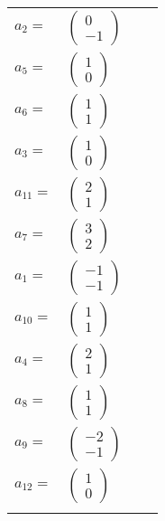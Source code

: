 \documentclass[1p]{elsarticle_modified}
\theoremstyle{definition}
\begin{document}
\begin{tabular}{m{7pt} m{180pt} m{7pt} m{180pt} }
\flushright $a_{2}=$&$\begin{pmatrix}0\\-1\end{pmatrix}$ \\
\flushright $a_{5}=$&$\begin{pmatrix}1\\0\end{pmatrix}$ \\
\flushright $a_{6}=$&$\begin{pmatrix}1\\1\end{pmatrix}$ \\
\flushright $a_{3}=$&$\begin{pmatrix}1\\0\end{pmatrix}$ \\
\flushright $a_{11}=$&$\begin{pmatrix}2\\1\end{pmatrix}$ \\
\flushright $a_{7}=$&$\begin{pmatrix}3\\2\end{pmatrix}$ \\
\flushright $a_{1}=$&$\begin{pmatrix}-1\\-1\end{pmatrix}$ \\
\flushright $a_{10}=$&$\begin{pmatrix}1\\1\end{pmatrix}$ \\
\flushright $a_{4}=$&$\begin{pmatrix}2\\1\end{pmatrix}$ \\
\flushright $a_{8}=$&$\begin{pmatrix}1\\1\end{pmatrix}$ \\
\flushright $a_{9}=$&$\begin{pmatrix}-2\\-1\end{pmatrix}$ \\
\flushright $a_{12}=$&$\begin{pmatrix}1\\0\end{pmatrix}$\\&\end{tabular}
\end{document}
